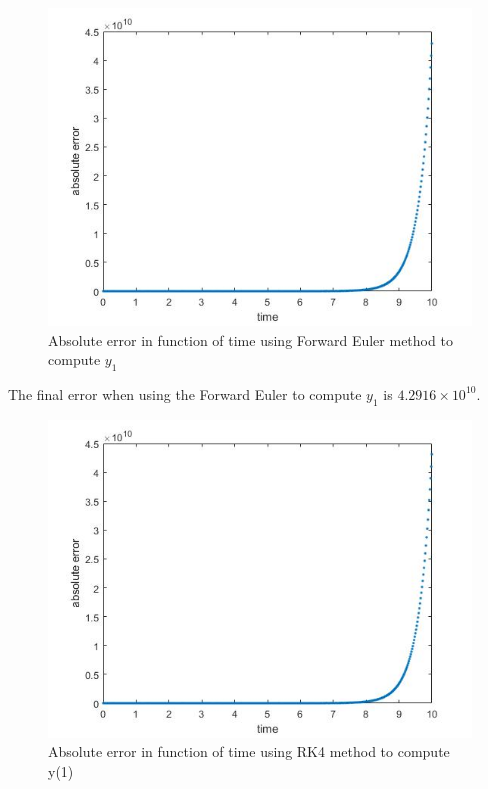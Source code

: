 \documentclass[a4paper, 11pt]{article}
\begin{document}
		\begin{figure}[H]
			\centering
			\includegraphics[width=\linewidth]{ex1_fe.jpg}
			\caption{Absolute error in function of time using Forward Euler method to compute $y_1$}
			\label{fig:ex1_fe}
		\end{figure}
		
		The final error when using the Forward Euler to compute $y_1$ is $4.2916 \times 10^{10}$.
		
		\begin{figure}[H]
			\centering
			\includegraphics[width=\linewidth]{ex1_rk4.jpg}
			\caption{Absolute error in function of time using RK4 method to compute y(1)}
			\label{fig:ex1_rk4}
		\end{figure}
		
\end{document}
